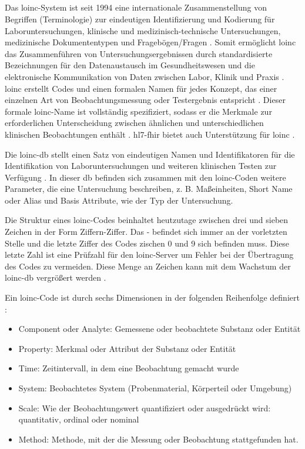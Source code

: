\subsection{} \label{subsec:loinc}

Das \acf{loinc}-System ist seit 1994 eine internationale Zusammenstellung von Begriffen (Terminologie) zur eindeutigen Identifizierung und Kodierung für Laboruntersuchungen, klinische und medizinisch-technische Untersuchungen, medizinische Dokumententypen und Fragebögen/Fragen \cite{loincbfarm, loincpaper}. Somit ermöglicht \ac{loinc} das Zusammenführen von Untersuchungsergebnissen durch standardisierte Bezeichnungen für den Datenaustausch im Gesundheitswesen und die elektronische Kommunikation von Daten zwischen Labor, Klinik und Praxis \cite{interop}. \ac{loinc} erstellt Codes und einen formalen Namen für jedes Konzept, das einer einzelnen Art von Beobachtungsmessung oder Testergebnis entspricht \cite{interop}. Dieser formale \ac{loinc}-Name ist vollständig spezifiziert, sodass er die Merkmale zur erforderlichen Unterscheidung zwischen ähnlichen und unterschiedlichen klinischen Beobachtungen enthält \cite{telemedizin}. \ac{hl7}-\ac{fhir} bietet auch Unterstützung für \ac{loinc} \cite{loincpaper}.

Die \ac{loinc}-\ac{db} stellt einen Satz von eindeutigen Namen und Identifikatoren für die Identifikation von Laboruntersuchungen und weiteren klinischen Testen zur Verfügung \cite{loincbas}. In dieser \ac{db} befinden sich zusammen mit den \ac{loinc}-Coden weitere Parameter, die eine Untersuchung beschreiben, z. B. Maßeinheiten, \glqq Short Name\grqq{} oder Alias und Basis Attribute, wie der Typ der Untersuchung.

Die Struktur eines \ac{loinc}-Codes beinhaltet heutzutage zwischen drei und sieben Zeichen in der Form \glqq Ziffern-Ziffer\grqq{}. Das \glqq-\grqq{} befindet sich immer an der vorletzten Stelle und die letzte Ziffer des Codes zischen 0 und 9 sich befinden muss. Diese letzte Zahl ist eine Prüfzahl für den \ac{loinc}-Server um Fehler bei der Übertragung des Codes zu vermeiden. Diese Menge an Zeichen kann mit dem Wachstum der \ac{loinc}-\ac{db} vergrößert werden \cite{loincoffi}.

Ein \ac{loinc}-Code ist durch sechs Dimensionen in der folgenden Reihenfolge definiert \cite{loincbfarm}: 
\begin{itemize}
	\item Component oder Analyte: Gemessene oder beobachtete Substanz oder Entität
	\item Property: Merkmal oder Attribut der Substanz oder Entität
	\item Time: Zeitintervall, in dem eine Beobachtung gemacht wurde
	\item System: Beobachtetes System (Probenmaterial, Körperteil oder Umgebung)
	\item Scale: Wie der Beobachtungswert quantifiziert oder ausgedrückt wird: quantitativ, ordinal oder nominal
	\item Method: Methode, mit der die Messung oder Beobachtung stattgefunden hat.
\end{itemize}

